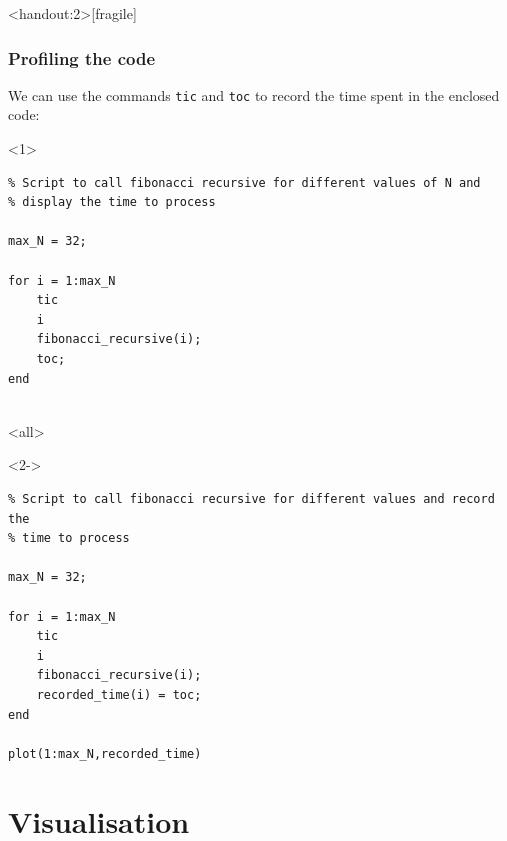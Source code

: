 \begin{frame}<handout:2>[fragile]
  \frametitle{Profiling the code}
  We can use the commands \lstinline$tic$ and \lstinline$toc$ to record the time spent in the enclosed code:
    \begin{onlyenv}<1>
      \lstset{showlines=true}
    \begin{lstlisting}
% Script to call fibonacci recursive for different values of N and 
% display the time to process

max_N = 32;

for i = 1:max_N
    tic
    i
    fibonacci_recursive(i);
    toc;
end


    \end{lstlisting}
  \end{onlyenv}
  \mode<all>
  \begin{onlyenv}<2->
    \begin{lstlisting}
% Script to call fibonacci recursive for different values and record the
% time to process

max_N = 32;

for i = 1:max_N
    tic
    i
    fibonacci_recursive(i);
    recorded_time(i) = toc;
end

plot(1:max_N,recorded_time)
        \end{lstlisting}
      \end{onlyenv}
\end{frame}

\section{Visualisation}
